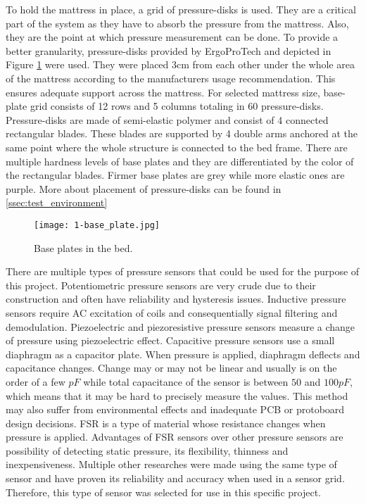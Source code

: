 To hold the mattress in place, a grid of pressure-disks is used. They are a critical part of the system as they have to absorb the pressure from the mattress. Also, they are the point at which pressure measurement can be done. To provide a better granularity, pressure-disks provided by ErgoProTech and depicted in Figure \ref{fig:base-plate} were used. They were placed 3cm from each other under the whole area of the mattress according to the manufacturers usage recommendation. This ensures adequate support across the mattress. For selected mattress size, base-plate grid consists of 12 rows and 5 columns totaling in 60 pressure-disks. Pressure-disks are made of semi-elastic polymer and consist of 4 connected rectangular blades. These blades are supported by 4 double arms anchored at the same point where the whole structure is connected to the bed frame. There are multiple hardness levels of base plates and they are differentiated by the color of the rectangular blades. Firmer base plates are grey while more elastic ones are purple. More about placement of pressure-disks can be found in \autoref{ssec:test_environment}

\begin{figure}[h]
  \begin{center}
    \texttt{[image: 1-base\_plate.jpg]}
  \end{center}
  \caption{Base plates in the bed.}
  \label{fig:base-plate}
\end{figure}

There are multiple types of pressure sensors that could be used for the purpose of this project\cite{pressure_sensors}. Potentiometric pressure sensors are very crude due to their construction and often have reliability and hysteresis issues. Inductive pressure sensors require \ac{AC} excitation of coils and consequentially signal filtering and demodulation. Piezoelectric and piezoresistive pressure sensors measure a change of pressure using piezoelectric effect. Capacitive pressure sensors use a small diaphragm as a capacitor plate. When pressure is applied, diaphragm deflects and capacitance changes. Change may or may not be linear and usually is on the order of a few $pF$ while total capacitance of the sensor is between $50$ and $100 pF$, which means that it may be hard to precisely measure the values. This method may also suffer from environmental effects and inadequate \ac{PCB} or protoboard design decisions. \ac{FSR} is a type of material whose resistance changes when pressure is applied. Advantages of \ac{FSR} sensors over other pressure sensors are possibility of detecting static pressure, its flexibility, thinness and inexpensiveness. Multiple other researches were made using the same type of sensor and have proven its reliability and accuracy when used in a sensor grid\cite{pillow_system_1}\cite{pillow_system_2}\cite{apnea_low_cost}. Therefore, this type of sensor was selected for use in this specific project.

